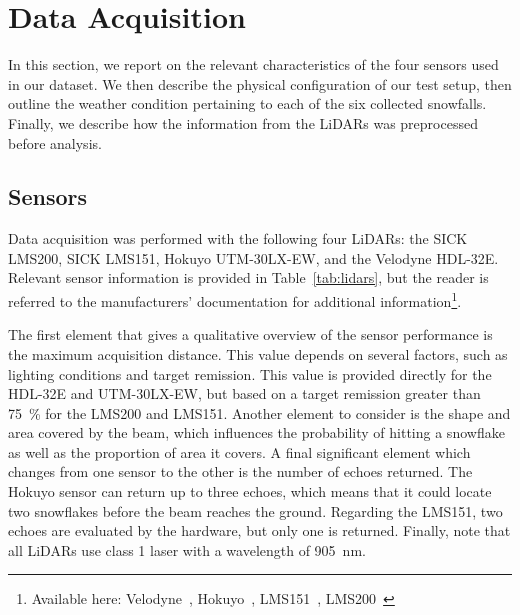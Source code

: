 \section{Data Acquisition}
\label{sec:chap_lidar_data_acquisition}

In this section, we report on the relevant characteristics of the four sensors used in our dataset. We then describe the physical configuration of our test setup, then outline the weather condition pertaining to each of the six collected snowfalls. Finally, we describe how the information from the LiDARs was preprocessed before analysis.

\subsection{Sensors}

Data acquisition was performed with the following four LiDARs: the SICK LMS200, SICK LMS151, Hokuyo UTM-30LX-EW, and the Velodyne HDL-32E. Relevant sensor information is provided in Table~\ref{tab:lidars}, but the reader is referred to the manufacturers' documentation for additional information\footnote{Available here: Velodyne~\cite{VelodyneManual}, Hokuyo~\cite{UTMDatasheet}, LMS151~\cite{LMS151Datasheet}, LMS200~\cite{LMS200Manual}}.

The first element that gives a qualitative overview of the sensor performance is the maximum acquisition distance. This value depends on several factors, such as lighting conditions and target remission. This value is provided directly for the HDL-32E and UTM-30LX-EW, but based on a target remission greater than \SI{75}{\percent} for the LMS200 and LMS151. Another element to consider is the shape and area covered by the beam, which influences the probability of hitting a snowflake as well as the proportion of area it covers. A final significant element which changes from one sensor to the other is the number of echoes returned. The Hokuyo sensor can return up to three echoes, which means that it could locate two snowflakes before the beam reaches the ground. Regarding the LMS151, two echoes are evaluated by the hardware, but only one is returned. Finally, note that all LiDARs use class 1 laser with a wavelength of \SI{905}{\nano\meter}.

